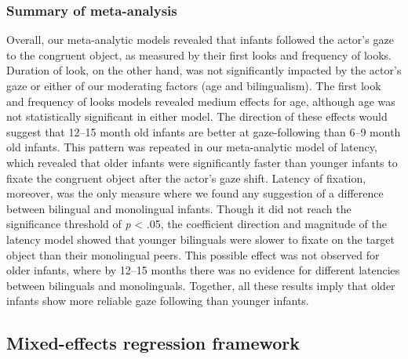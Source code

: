 \documentclass[english,,man,floatsintext]{apa6}
\begin{document}
\hypertarget{summary-of-meta-analysis}{%
\subsubsection{Summary of meta-analysis}\label{summary-of-meta-analysis}}

Overall, our meta-analytic models revealed that infants followed the actor's gaze to the congruent object, as measured by their first looks and frequency of looks. Duration of look, on the other hand, was not significantly impacted by the actor's gaze or either of our moderating factors (age and bilingualism). The first look and frequency of looks models revealed medium effects for age, although age was not statistically significant in either model. The direction of these effects would suggest that 12--15 month old infants are better at gaze-following than 6--9 month old infants. This pattern was repeated in our meta-analytic model of latency, which revealed that older infants were significantly faster than younger infants to fixate the congruent object after the actor's gaze shift. Latency of fixation, moreover, was the only measure where we found any suggestion of a difference between bilingual and monolingual infants. Though it did not reach the significance threshold of \emph{p} \textless{} .05, the coefficient direction and magnitude of the latency model showed that younger bilinguals were slower to fixate on the target object than their monolingual peers. This possible effect was not observed for older infants, where by 12--15 months there was no evidence for different latencies between bilinguals and monolinguals. Together, all these results imply that older infants show more reliable gaze following than younger infants.

\hypertarget{mixed-effects-regression-framework}{%
\subsection{Mixed-effects regression framework}\label{mixed-effects-regression-framework}}
\end{document}
